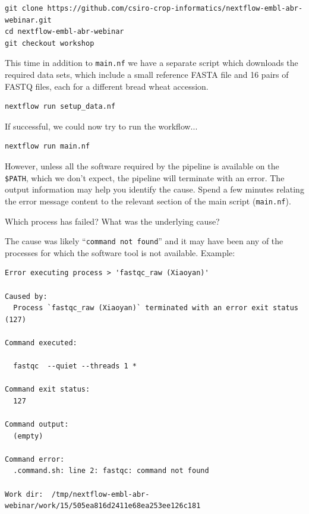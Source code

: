 \begin{steps}
\begin{lstlisting}
git clone https://github.com/csiro-crop-informatics/nextflow-embl-abr-webinar.git
cd nextflow-embl-abr-webinar
git checkout workshop
\end{lstlisting}



This time in addition to \texttt{main.nf} we have a separate script which downloads the required data sets, which include a small reference FASTA file and 16 pairs of FASTQ files, each for a different bread wheat accession.


\begin{lstlisting}
nextflow run setup_data.nf
\end{lstlisting}


If successful, we could now try to run the workflow...

\begin{lstlisting}
nextflow run main.nf
\end{lstlisting}


However, unless all the software required by the pipeline is available on the \texttt{\$PATH},
which we don't expect, the pipeline will terminate with an error.
The output information may help you identify the cause. 
Spend a few minutes relating the error message content to the relevant section of the main script (\texttt{main.nf}). 
\end{steps}

\begin{questions}
Which process has failed?
What was the underlying cause?
\begin{answer}
The cause was likely ``\texttt{command not found}'' and it may have been any of the processes for which the software tool is not available.
Example:
\begin{lstlisting}
Error executing process > 'fastqc_raw (Xiaoyan)'

Caused by:
  Process `fastqc_raw (Xiaoyan)` terminated with an error exit status (127)

Command executed:

  fastqc  --quiet --threads 1 *

Command exit status:
  127

Command output:
  (empty)

Command error:
  .command.sh: line 2: fastqc: command not found

Work dir:  /tmp/nextflow-embl-abr-webinar/work/15/505ea816d2411e68ea253ee126c181
\end{lstlisting}
\end{answer}
\end{questions}



